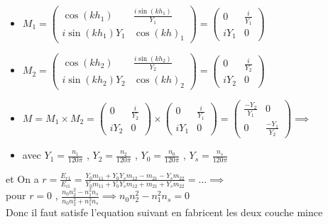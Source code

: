 \documentclass[12pt]{book}
\begin{document}
            \begin{itemize}
                \item $M_1 =
                \begin{pmatrix}
                    \cos(kh_1) & \frac{i\sin(kh_1)}{Y_1} \\
                    i\sin(kh_1)Y_1 & \cos(kh)_1 
                \end{pmatrix} =
                \begin{pmatrix}
                    0 & \frac{i}{Y_1} \\
                    iY_1 & 0
                \end{pmatrix}$
                \item $M_2 =
                \begin{pmatrix}
                    \cos(kh_2) & \frac{i\sin(kh_2)}{Y_2} \\
                    i\sin(kh_2)Y_2 & \cos(kh)_2 
                \end{pmatrix} =
                \begin{pmatrix}
                    0 & \frac{i}{Y_2} \\
                    iY_2 & 0
                \end{pmatrix}$
                \item  $M = M_1 \times M_2 =\begin{pmatrix} 0 & \frac{i}{Y_2} \\ iY_2 & 0\end{pmatrix} \times\begin{pmatrix} 0 & \frac{i}{Y_1} \\iY_1 & 0 \end{pmatrix} = \begin{pmatrix} \frac{-Y_2}{Y_1} & 0 \\0 & \frac{-Y_1}{Y_2} \end{pmatrix} \implies$  \\
                \item avec $Y_1 =\frac{n_1}{120\pi}$ , $Y_2 =\frac{n_2}{120\pi}$ , $Y_0 =\frac{n_0}{120\pi}$ , $Y_s =\frac{n_s}{120\pi}$
            \end{itemize}
            et On a $r=\frac{E_{r1}}{E_{i1}} = \frac{Y_0m_{11}+Y_0Y_sm_{12}-m_{21}-Y_sm_{22}}{Y_0m_{11}+Y_0Y_sm_{12}+m_{21}+Y_sm_{22}} =\ldots  \implies$ \\
            pour $r = 0 $ , $\frac{n_0n_2^2-n_1^2n_s}{n_0n_2^2+n_1^2n_s}\implies n_0n_2^2-n_1^2n_s =0$ \\
            Donc il faut satisfe l'equation suivant  en fabricent les deux couche mince 
            
\end{document}
